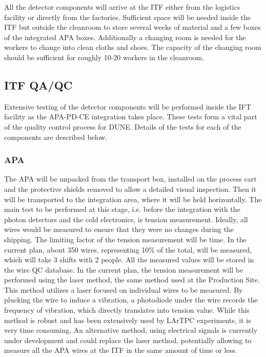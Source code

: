 All the detector  components will arrive at the ITF either from the logistics facility or directly from the factories. Sufficient space will be needed inside the ITF but outside the cleanroom to store several weeks of material and a few boxes of the integrated APA boxes. Additionally a changing room is needed for the workers to change into clean cloths and shoes. The capacity of the changing room should be sufficient for roughly 10-20 workers in the cleanroom. 

\subsection{ITF QA/QC}
\label{sec:fdsp-tc-itf-qaqc}
Extensive testing of the detector components will be performed inside the IFT facility as the APA-PD-CE integration takes place. These tests form a vital part of the quality control process for DUNE. Details of the tests for each of the components are described below.

\subsubsection{APA}
The APA will be unpacked from the transport box, installed on the process cart and the protective shields removed to allow a detailed visual inspection. Then it will be transported to the integration area, where it will be held horizontally. The main test to be performed at this stage, i.e. before the integration with the photon detectors and the cold electronics, is tension measurement. Ideally, all wires would be measured to ensure that they were no changes during the shipping. The limiting factor of the tension measurement will be time. In the current plan, about 350 wires, representing 10$\%$ of the total, will be measured, which will take 3 shifts with 2 people. All the measured values will be stored in the wire QC database. In the current plan, the tension measurement will be performed using the laser method, the same method used at the Production Site. This method utilizes a laser focused on individual wires to be measured. By plucking the wire to induce a vibration, a photodiode under the wire records the frequency of vibration, which directly translates into tension value. While this method is robust and has been extensively used by LArTPC experiments, it is very time consuming. An alternative method, using electrical signals is currently under development and could replace the laser method, potentially allowing to measure all the APA wires at the ITF in the same amount of time or less.

